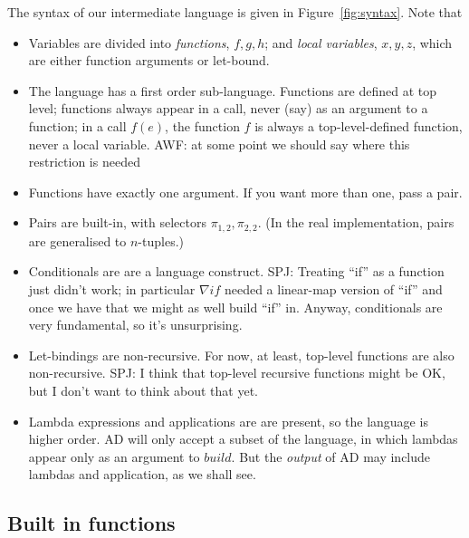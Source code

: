 \documentclass[sigplan,review]{acmart}
\newcommand{\gradf}[1]{\nabla\! \mathit{#1}}  %
\newcommand{\sel}[2]{\pi_{#1,#2}}
\newcommand{\buildfun}{\mathit{build}}
\newcommand{\simon}[1]{{\color{red}SPJ: #1}}
\newcommand{\awf}[1]{{\color{teal}AWF: #1}}
\begin{document}
The syntax of our intermediate language is given in Figure~\ref{fig:syntax}.
Note that
\begin{itemize}
\item  Variables are divided into \emph{functions}, $f,g,h$; and \emph{local variables}, $x,y,z$,
  which are either function arguments or let-bound.
\item 
  The language has a first order sub-language.  Functions are defined at top level;
  functions always appear in a call, never (say) as an argument to a
  function; in a call $f(e)$, the function $f$ is always a
  top-level-defined function, never a local variable.  \awf{at some point we should say where this restriction is needed}

\item Functions have exactly one argument. If you want more than one, pass a pair.

\item Pairs are built-in, with selectors $\sel{1}{2}, \sel{2}{2}$.
  (In the real implementation, pairs are generalised to $n$-tuples.)

\item Conditionals are are a language construct. \simon{Treating ``if'' as a function
  just didn't work; in particular $\gradf{if}$ needed a linear-map version of
  ``if'' and once we have that we might as well build ``if'' in.  Anyway,
  conditionals are very fundamental, so it's unsurprising.}

\item Let-bindings are non-recursive. For now, at least, top-level
  functions are also non-recursive.  \simon{I think that top-level
    recursive functions might be OK, but I don't want to think about
    that yet.}

\item Lambda expressions and applications are are present, so the language
  is higher order.  AD will only accept a subset of the language, in
  which lambdas appear only as an argument to $\buildfun$.  But the
  \emph{output} of AD may include lambdas and application, as we shall see.
  \end{itemize}

\subsection{Built in functions}
\end{document}
